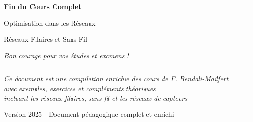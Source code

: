 \documentclass[12pt,a4paper]{article}
\begin{document}
\newpage
\begin{center}
\textcolor{titrebleu}{\Huge\textbf{Fin du Cours Complet}}

\vspace{2em}

\textcolor{defvert}{\Large Optimisation dans les Réseaux}

\vspace{0.5em}

\textcolor{algoviolet}{\large Réseaux Filaires et Sans Fil}

\vspace{1em}

\textit{Bon courage pour vos études et examens !}

\vspace{2em}

\rule{0.5\textwidth}{0.4pt}

\vspace{1em}

\small
\textit{Ce document est une compilation enrichie des cours de F. Bendali-Mailfert}\\
\textit{avec exemples, exercices et compléments théoriques}\\
\textit{incluant les réseaux filaires, sans fil et les réseaux de capteurs}

\vspace{1em}

Version 2025 - Document pédagogique complet et enrichi
\end{center}
\end{document}
